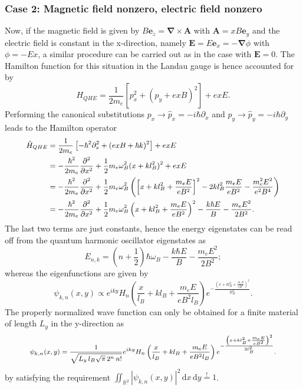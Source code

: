 \documentclass{report}
\numberwithin{tm}{section}
\newcommand\vect[1]{\ensuremath{\bm{#1}}}
\begin{document}
\subsubsection{Case 2: Magnetic field nonzero, electric field nonzero} Now, if the magnetic field is given by $B\vect{e}_z = \vect{\nabla}\times \vect{A}$ with $\vect{A} = xB\vect{e}_y$ and the electric field is constant in the x-direction, namely $\vect{E} = E\vect{e}_x = -\vect{\nabla}\phi$ with $\phi = -Ex$, a similar procedure can be carried out as in the case with $\vect{E} =0$. The Hamilton function for this situation in the Landau gauge is hence accounted for by \begin{equation}
	H_{QHE} = \frac{1}{2m_e}\left[p_x^2 + (p_y + exB)^2\right] +exE.
\end{equation} Performing the canonical substitutions $p_x \rightarrow \hat{p}_x = -i\hbar \partial_x$ and $p_y \rightarrow \hat{p}_y = -i\hbar \partial_y$ leads to the Hamilton operator \begin{align}\small\begin{aligned}
\hat{H}_{QHE} &= \frac{1}{2m_e}\left[-\hbar^2 \partial_x^2 + (exB + \hbar k)^2\right] + exE \\
&= -\frac{\hbar^2}{2m_e}\frac{\partial^2}{\partial x^2} + \frac{1}{2}m_e\omega_B^2(x+kl_B^2)^2 + exE \\
&= -\frac{\hbar^2}{2m_e}\frac{\partial^2}{\partial x^2} + \frac{1}{2}m_e\omega_B^2\left(\left[x+kl_B^2 + \frac{m_eE}{eB^2}\right]^2 -2kl_B^2\frac{m_eE}{eB^2}-\frac{m_e^2E^2}{e^2B^4}\right) \\
&= -\frac{\hbar^2}{2m_e}\frac{\partial^2}{\partial x^2} + \frac{1}{2}m_e\omega_B^2\left(x+kl_B^2 + \frac{m_eE}{eB^2}\right)^2 -\frac{k\hbar E}{B} - \frac{m_e E^2}{2B^2}.
\end{aligned}\end{align} The last two terms are just constants, hence the energy eigenstates can be read off from the quantum harmonic oscillator eigenstates as \begin{equation}\label{eq:quantumhall_eigenstates_electricnonzero}
E_{n,k} = \left(n+\frac{1}{2}\right)\hbar \omega_B -\frac{k\hbar E}{B} - \frac{m_e E^2}{2B^2};
\end{equation} whereas the eigenfunctions are given by \begin{equation}
\psi_{k,n}(x,y) \propto e^{iky}H_n\left(\frac{x}{l_B} + kl_B + \frac{m_eE}{eB^2l_B}\right)e^{-\frac{\left(x+kl_B^2+\frac{m_eE}{eB^2}\right)^2}{2l_B^2}}.
\end{equation} The properly normalized wave function can only be obtained for a finite material of length $L_y$ in the y-direction as\begin{align}\footnotesize\begin{aligned}\label{eq:quantumhall_eigenfunctions_electricnonzero}
\psi_{k,n}(x,y) = \frac{1}{\sqrt{L_y \, l_B \sqrt{\pi} \, 2^n \, n!}} e^{iky} H_n\left(\frac{x}{l_B} + kl_B + \frac{m_e E}{eB^2 l_B}\right) e^{-\frac{\left(x+kl_B^2+\frac{m_e E}{eB^2}\right)^2}{2l_B^2}}.
\end{aligned}\end{align} by satisfying the requirement $\iint_{\mathbb{R}^2}|\psi_{k,n}(x,y)|^2\,\mathrm{d}x\,\mathrm{d}y \overset{!}{=} 1$.
\end{document}

